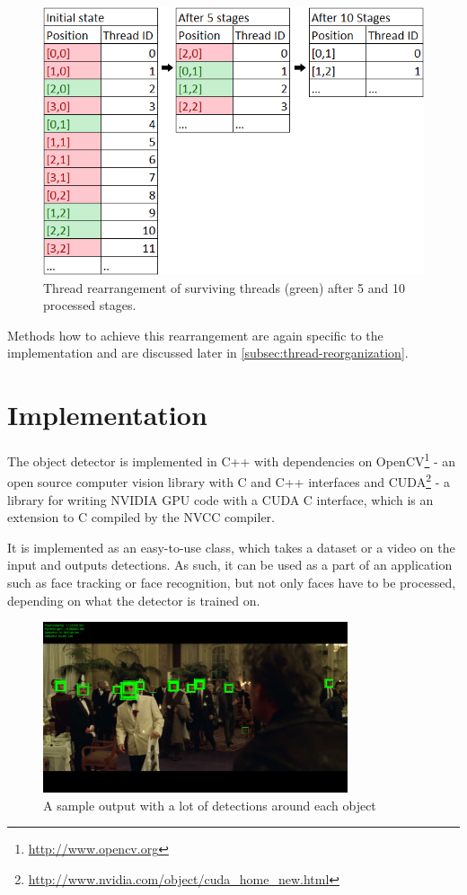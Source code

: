 \begin{center}
\begin{figure}[h]
	\centering\includegraphics[width=0.6\linewidth]{fig/threadrear.png}
	\caption{Thread rearrangement of surviving threads (green) after 5 and 10 processed stages.}
	\label{fig:thread-rearrangement}
\end{figure}
\end{center}

Methods how to achieve this rearrangement are again specific to the implementation and are discussed later in \ref{subsec:thread-reorganization}.

\chapter{Implementation}

The object detector is implemented in C++ with dependencies on OpenCV\footnote{\url{http://www.opencv.org}} - an open source computer vision library with C and C++ interfaces and CUDA\footnote{\url{http://www.nvidia.com/object/cuda_home_new.html}} - a library for writing NVIDIA GPU code with a CUDA C interface, which is an extension to C compiled by the NVCC compiler.

It is implemented as an easy-to-use class, which takes a dataset or a video on the input and outputs detections. As such, it can be used as a part of an application such as face tracking or face recognition, but not only faces have to be processed, depending on what the detector is trained on.

\begin{center}
\begin{figure}[h]
	\centering\includegraphics[width=0.8\textwidth]{fig/sample.jpg}
	\caption{A sample output with a lot of detections around each object}
	\label{fig:sample}
\end{figure}
\end{center}

